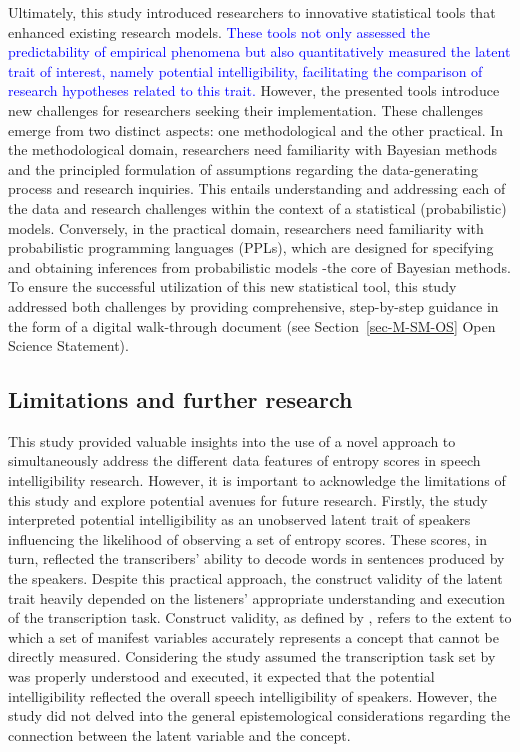 \documentclass[
  authoryear,
  preprint,
  1p]{elsarticle}
\begin{document}
Ultimately, this study introduced researchers to innovative statistical
tools that enhanced existing research models. \textcolor{blue}{These tools not only
assessed the predictability of empirical phenomena but also
quantitatively measured the latent trait of interest, namely potential
intelligibility, facilitating the comparison of research hypotheses
related to this trait.} However, the presented tools introduce new
challenges for researchers seeking their implementation. These
challenges emerge from two distinct aspects: one methodological and the
other practical. In the methodological domain, researchers need
familiarity with Bayesian methods and the principled formulation of
assumptions regarding the data-generating process and research
inquiries. This entails understanding and addressing each of the data
and research challenges within the context of a statistical
(probabilistic) models. Conversely, in the practical domain, researchers
need familiarity with probabilistic programming languages (PPLs), which
are designed for specifying and obtaining inferences from probabilistic
models -the core of Bayesian methods. To ensure the successful
utilization of this new statistical tool, this study addressed both
challenges by providing comprehensive, step-by-step guidance in the form
of a digital walk-through document (see Section~\ref{sec-M-SM-OS} Open
Science Statement).

\subsection{Limitations and further research}\label{sec-D-LFR}

This study provided valuable insights into the use of a novel approach
to simultaneously address the different data features of entropy scores
in speech intelligibility research. However, it is important to
acknowledge the limitations of this study and explore potential avenues
for future research. Firstly, the study interpreted potential
intelligibility as an unobserved latent trait of speakers influencing
the likelihood of observing a set of entropy scores. These scores, in
turn, reflected the transcribers' ability to decode words in sentences
produced by the speakers. Despite this practical approach, the construct
validity of the latent trait heavily depended on the listeners'
appropriate understanding and execution of the transcription task.
Construct validity, as defined by \citet{Cronbach_et_al_1955}, refers to
the extent to which a set of manifest variables accurately represents a
concept that cannot be directly measured. Considering the study assumed
the transcription task set by \citet{Boonen_et_al_2023} was properly
understood and executed, it expected that the potential intelligibility
reflected the overall speech intelligibility of speakers. However, the
study did not delved into the general epistemological considerations
regarding the connection between the latent variable and the concept.
\end{document}
